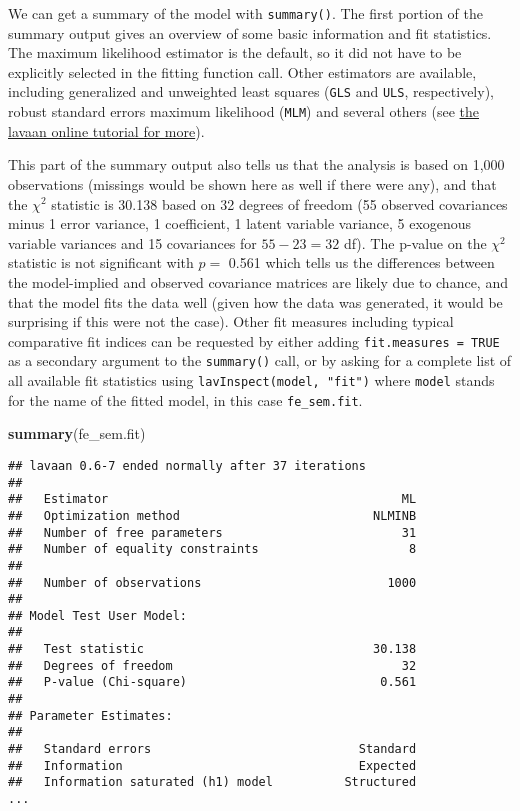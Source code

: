 \documentclass[]{interact}
\theoremstyle{plain}%
\theoremstyle{definition}
\theoremstyle{remark}
\newenvironment{Shaded}{\begin{snugshade}}{\end{snugshade}}
\newcommand{\KeywordTok}[1]{\textcolor[rgb]{0.13,0.29,0.53}{\textbf{#1}}}
\newcommand{\NormalTok}[1]{#1}
\begin{document}
\singlespacing

\doublespacing

We can get a summary of the model with \texttt{summary()}. The first
portion of the summary output gives an overview of some basic
information and fit statistics. The maximum likelihood estimator is the
default, so it did not have to be explicitly selected in the fitting
function call. Other estimators are available, including generalized and
unweighted least squares (\texttt{GLS} and \texttt{ULS}, respectively),
robust standard errors maximum likelihood (\texttt{MLM}) and several
others (see \href{https://lavaan.ugent.be/tutorial/est.html}{the lavaan
online tutorial for more}).

This part of the summary output also tells us that the analysis is based
on 1,000 observations (missings would be shown here as well if there
were any), and that the \(\chi^{2}\) statistic is 30.138 based on 32
degrees of freedom (55 observed covariances minus 1 error variance, 1
coefficient, 1 latent variable variance, 5 exogenous variable variances
and 15 covariances for \(55 - 23 = 32\) df). The p-value on the
\(\chi^{2}\) statistic is not significant with \(p =\) 0.561 which tells
us the differences between the model-implied and observed covariance
matrices are likely due to chance, and that the model fits the data well
(given how the data was generated, it would be surprising if this were
not the case). Other fit measures including typical comparative fit
indices can be requested by either adding \texttt{fit.measures\ =\ TRUE}
as a secondary argument to the \texttt{summary()} call, or by asking for
a complete list of all available fit statistics using
\texttt{lavInspect(model,\ "fit")} where \texttt{model} stands for the
name of the fitted model, in this case \texttt{fe\_sem.fit}.

\singlespacing

\begin{Shaded}
\begin{Highlighting}[]
\KeywordTok{summary}\NormalTok{(fe\_sem.fit)}
\end{Highlighting}
\end{Shaded}

\begin{verbatim}
## lavaan 0.6-7 ended normally after 37 iterations
## 
##   Estimator                                         ML
##   Optimization method                           NLMINB
##   Number of free parameters                         31
##   Number of equality constraints                     8
##                                                       
##   Number of observations                          1000
##                                                       
## Model Test User Model:
##                                                       
##   Test statistic                                30.138
##   Degrees of freedom                                32
##   P-value (Chi-square)                           0.561
## 
## Parameter Estimates:
## 
##   Standard errors                             Standard
##   Information                                 Expected
##   Information saturated (h1) model          Structured
...
\end{verbatim}
\end{document}

